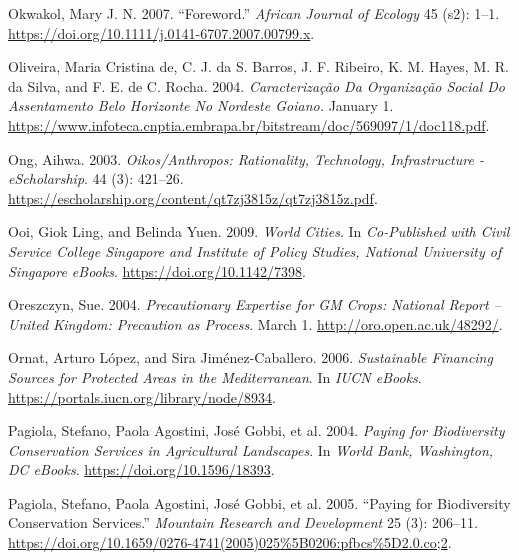 \begin{CSLReferences}{1}{1}
Okwakol, Mary J. N. 2007. {``Foreword.''} \emph{African Journal of
Ecology} 45 (s2): 1--1.
\url{https://doi.org/10.1111/j.0141-6707.2007.00799.x}.

Oliveira, Maria Cristina de, C. J. da S. Barros, J. F. Ribeiro, K. M.
Hayes, M. R. da Silva, and F. E. de C. Rocha. 2004. \emph{Caracterização
Da Organização Social Do Assentamento Belo Horizonte No Nordeste
Goiano.} January 1.
\url{https://www.infoteca.cnptia.embrapa.br/bitstream/doc/569097/1/doc118.pdf}.

Ong, Aihwa. 2003. \emph{Oikos/Anthropos: Rationality, Technology,
Infrastructure - eScholarship}. 44 (3): 421--26.
\url{https://escholarship.org/content/qt7zj3815z/qt7zj3815z.pdf}.

Ooi, Giok Ling, and Belinda Yuen. 2009. \emph{World Cities}. In
\emph{Co-Published with Civil Service College Singapore and Institute of
Policy Studies, National University of Singapore eBooks}.
\url{https://doi.org/10.1142/7398}.

Oreszczyn, Sue. 2004. \emph{Precautionary Expertise for GM Crops:
National Report -- United Kingdom: Precaution as Process}. March 1.
\url{http://oro.open.ac.uk/48292/}.

Ornat, Arturo López, and Sira Jiménez-Caballero. 2006. \emph{Sustainable
Financing Sources for Protected Areas in the Mediterranean}. In
\emph{IUCN eBooks}. \url{https://portals.iucn.org/library/node/8934}.

Pagiola, Stefano, Paola Agostini, José Gobbi, et al. 2004. \emph{Paying
for Biodiversity Conservation Services in Agricultural Landscapes}. In
\emph{World Bank, Washington, DC eBooks}.
\url{https://doi.org/10.1596/18393}.

Pagiola, Stefano, Paola Agostini, José Gobbi, et al. 2005. {``Paying for
Biodiversity Conservation Services.''} \emph{Mountain Research and
Development} 25 (3): 206--11.
\url{https://doi.org/10.1659/0276-4741(2005)025\%5B0206:pfbcs\%5D2.0.co;2}.


\end{CSLReferences}
